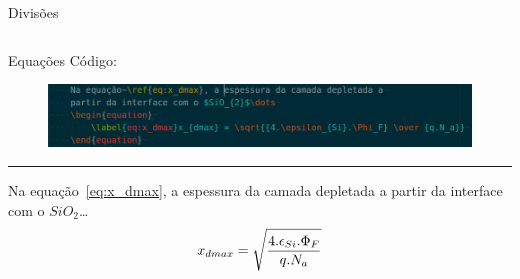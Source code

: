 \documentclass{beamer}
\begin{document}
\begin{frame}{Divisões}
\begin{columns}[T]
\begin{column}{.5\textwidth}
\begin{block}{}
            \end{block}
        \end{column}
    \end{columns}
\end{frame}


\begin{frame}{Equações}
    Código:
    \begin{figure}[!htb]
        \begin{center}
            \label{fig:equation_ex}
            \includegraphics[width=\columnwidth]{equation}
        \end{center}
    \end{figure}
    \rule{\textwidth}{1pt}
    Na equação~\ref{eq:x_dmax}, a espessura da camada depletada a
    partir da interface com o $SiO_{2}$\dots
    \begin{equation}
        \label{eq:x_dmax}x_{dmax} = \sqrt{{4.\epsilon_{Si}.\Phi_F} \over {q.N_a}}
    \end{equation}
\end{frame}
\end{document}
